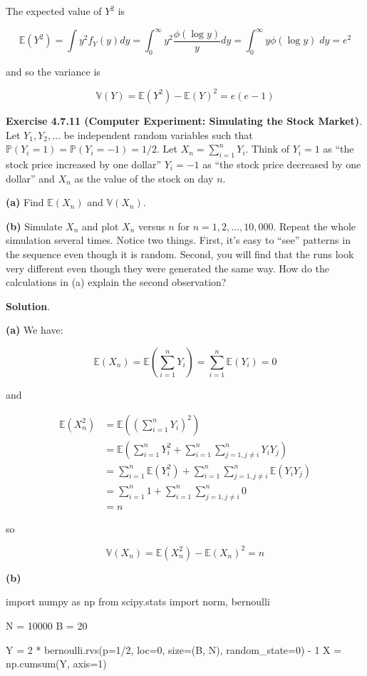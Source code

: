 The expected value of \(Y^2\) is

\[ \mathbb{E}(Y^2) = \int y^2 f_Y(y) dy = \int_0^\infty y^2 \frac{\phi(\log y)}{y} dy = \int_0^\infty y \phi(\log y)\; dy = e^2\]

and so the variance is

\[ \mathbb{V}(Y) = \mathbb{E}(Y^2) - \mathbb{E}(Y)^2 = e(e - 1) \]

\textbf{Exercise 4.7.11 (Computer Experiment: Simulating the Stock
Market)}. Let \(Y_1, Y_2, \dots\) be independent random variables such
that \(\mathbb{P}(Y_i = 1) = \mathbb{P}(Y_i = -1) = 1/2\). Let
\(X_n = \sum_{i=1}^n Y_i\). Think of \(Y_i = 1\) as ``the stock price
increased by one dollar'' \(Y_i = -1\) as ``the stock price decreased by
one dollar'' and \(X_n\) as the value of the stock on day \(n\).

\textbf{(a)} Find \(\mathbb{E}(X_n)\) and \(\mathbb{V}(X_n)\).

\textbf{(b)} Simulate \(X_n\) and plot \(X_n\) versus \(n\) for
\(n = 1, 2, \dots, 10,000\). Repeat the whole simulation several times.
Notice two things. First, it's easy to ``see'' patterns in the sequence
even though it is random. Second, you will find that the runs look very
different even though they were generated the same way. How do the
calculations in (a) explain the second observation?

\textbf{Solution}.

\textbf{(a)} We have:

\[ \mathbb{E}(X_n) = \mathbb{E}\left( \sum_{i=1}^n Y_i \right) = \sum_{i=1}^n \mathbb{E}(Y_i) = 0 \]

and

\begin{align}
\mathbb{E}(X_n^2) &= \mathbb{E}\left( \left( \sum_{i=1}^n Y_i \right)^2 \right) \\
&= \mathbb{E}\left( \sum_{i=1}^n Y_i^2 + \sum_{i=1}^n \sum_{j = 1, j \neq i}^n Y_i Y_j \right) \\
&= \sum_{i=1}^n \mathbb{E}(Y_i^2) + \sum_{i=1}^n \sum_{j = 1, j \neq i}^n \mathbb{E}(Y_i Y_j) \\
&= \sum_{i=1}^n 1 + \sum_{i=1}^n \sum_{j = 1, j \neq i}^n 0 \\
&= n
\end{align}

so

\[\mathbb{V}(X_n) = \mathbb{E}(X_n^2) - \mathbb{E}(X_n)^2 = n\]

\textbf{(b)}

\begin{python}
import numpy as np
from scipy.stats import norm, bernoulli

N = 10000
B = 20

Y = 2 * bernoulli.rvs(p=1/2, loc=0, size=(B, N), random_state=0) - 1
X = np.cumsum(Y, axis=1)
\end{python}

